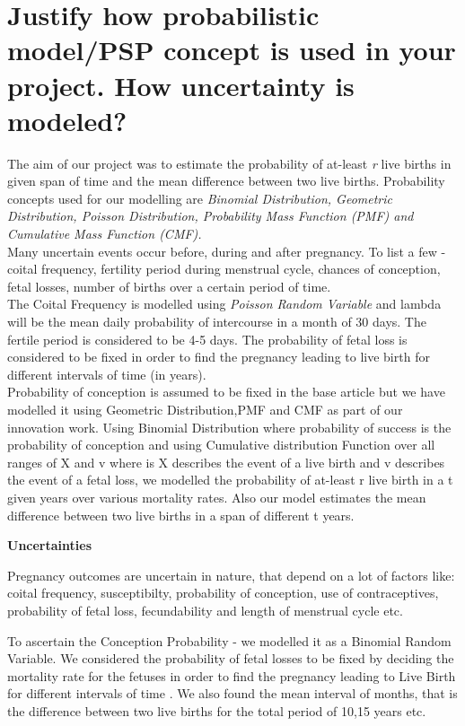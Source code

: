 \documentclass{article}
\begin{document}
\section {Justify how probabilistic model/PSP concept is used in your project. How uncertainty is modeled?}
{The aim of our project was to estimate the probability of at-least {\slshape r} live births in given span of time and the mean difference between two live births. Probability concepts used for our modelling are {\slshape Binomial Distribution, Geometric Distribution, Poisson Distribution, Probability Mass Function (PMF) and Cumulative Mass Function (CMF).}\\
Many uncertain events occur before, during and after pregnancy. To list a few - coital frequency, fertility period during menstrual cycle, chances of conception, fetal losses, number of births over a certain period of time.\\
The Coital Frequency is modelled using {\slshape Poisson Random Variable} and lambda will be the mean daily probability of intercourse in a month of 30 days. The fertile period is considered to be 4-5 days. The probability of fetal loss is considered to be fixed in order to find the pregnancy leading to live birth for different intervals of time (in years). \\
Probability of conception is assumed to be fixed in the base article but we have modelled it using Geometric Distribution,PMF and CMF as part of our innovation work. Using Binomial Distribution where probability of success is the probability of conception and using Cumulative distribution Function over all ranges of X and v where is X describes the event of a live birth and v describes the event of a fetal loss, we modelled the probability of at-least r live birth in a t given years over various mortality rates. Also our model estimates the mean difference between two live births in a span of different t years.}\\
\begin{center}
	{\large {\bfseries Uncertainties}}
\end{center}

Pregnancy outcomes are uncertain in nature, that depend on a lot of factors like: coital frequency,
susceptibilty,
probability of conception,
use of contraceptives,
probability of fetal loss,
fecundability and
length of menstrual cycle etc. %

To ascertain the Conception Probability - we modelled it as a Binomial Random Variable.
We considered the probability of fetal losses to be fixed by deciding the mortality rate for the fetuses in order to find the pregnancy leading to Live Birth for different intervals of time . We also found the mean interval of months, that is the difference between two live births for the total period of 10,15 years etc.\\
\end{document}
